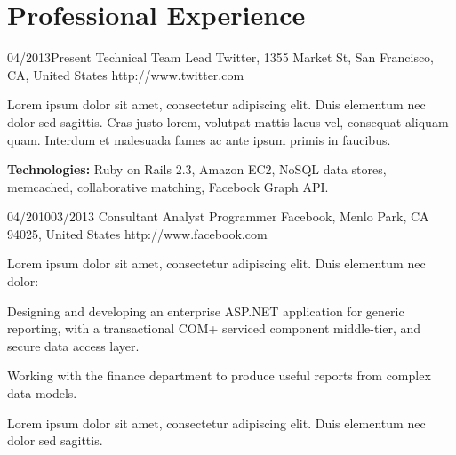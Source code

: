 \documentclass[10pt]{article} %
\begin{document}
\section*{Professional Experience}

\begin{job}
  {04/2013}{Present}
  {Technical Team Lead}
  {Twitter, 1355 Market St, San Francisco, CA, United States}
  {http://www.twitter.com}
  {Lorem ipsum dolor sit amet, consectetur adipiscing elit. Duis elementum nec dolor sed sagittis. Cras justo lorem, volutpat mattis lacus vel, consequat aliquam quam. Interdum et malesuada fames ac ante ipsum primis in faucibus.\\
    \rule{0mm}{5mm}\textbf{Technologies:} Ruby on Rails 2.3, Amazon EC2, NoSQL data stores, memcached, collaborative matching, Facebook Graph API.}
\end{job}


\begin{job}
  {04/2010}{03/2013}
  {Consultant Analyst Programmer}
  {Facebook, Menlo Park, CA 94025, United States}
  {http://www.facebook.com}
  {Lorem ipsum dolor sit amet, consectetur adipiscing elit. Duis elementum nec dolor:

    \begin{itemize-noindent}
    \item{Designing and developing an enterprise ASP.NET application for generic reporting, with a transactional COM+ serviced component middle-tier, and secure data access layer.}
    \item{Working with the finance department to produce useful reports from complex data models.}
    \end{itemize-noindent}

    Lorem ipsum dolor sit amet, consectetur adipiscing elit. Duis elementum nec dolor sed sagittis.}
\end{job}
\end{document}

